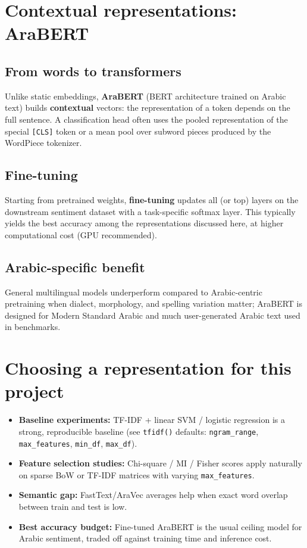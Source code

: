 \documentclass[11pt,a4paper]{report}
\begin{document}
\section{Contextual representations: AraBERT}

\subsection{From words to transformers}
Unlike static embeddings, \textbf{AraBERT} (BERT architecture trained on Arabic text) builds \textbf{contextual} vectors: the representation of a token depends on the full sentence. A classification head often uses the pooled representation of the special \texttt{[CLS]} token or a mean pool over subword pieces produced by the WordPiece tokenizer.

\subsection{Fine-tuning}
Starting from pretrained weights, \textbf{fine-tuning} updates all (or top) layers on the downstream sentiment dataset with a task-specific softmax layer. This typically yields the best accuracy among the representations discussed here, at higher computational cost (GPU recommended).

\subsection{Arabic-specific benefit}
General multilingual models underperform compared to Arabic-centric pretraining when dialect, morphology, and spelling variation matter; AraBERT is designed for Modern Standard Arabic and much user-generated Arabic text used in benchmarks.

\section{Choosing a representation for this project}

\begin{itemize}[noitemsep]
    \item \textbf{Baseline experiments:} TF-IDF + linear SVM / logistic regression is a strong, reproducible baseline (see \texttt{tfidf()} defaults: \texttt{ngram\_range}, \texttt{max\_features}, \texttt{min\_df}, \texttt{max\_df}).
    \item \textbf{Feature selection studies:} Chi-square / MI / Fisher scores apply naturally on sparse BoW or TF-IDF matrices with varying \texttt{max\_features}.
    \item \textbf{Semantic gap:} FastText/AraVec averages help when exact word overlap between train and test is low.
    \item \textbf{Best accuracy budget:} Fine-tuned AraBERT is the usual ceiling model for Arabic sentiment, traded off against training time and inference cost.
\end{itemize}
\end{document}
